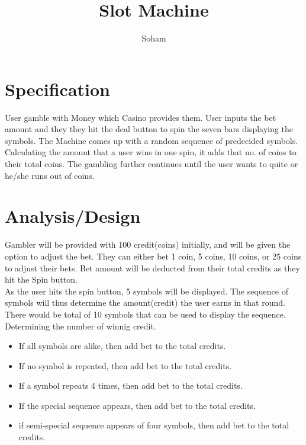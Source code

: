 \documentclass{article}
\title{Slot Machine}
\author{Soham}
\begin{document}
\maketitle

\section{Specification}
User gamble with Money which Casino provides them. User inputs the bet amount and they they hit the deal button to spin the seven bars displaying the symbols.
The Machine comes up with a random sequence of predecided symbols.
Calculating the amount that a user wins in one spin, it adds that no. of coins to their total coins.
The gambling further continues until the user wants to quite or he/she runs out of coins.




\section{Analysis/Design}
Gambler will be provided with 100 credit(coins) initially, and will be given the option to adjust the bet. They can either bet 1 coin, 5 coins, 10 coins, or 25 coins to adjust their bets. Bet amount will be deducted from their total credits as they hit the Spin button.\\

As the user hits the spin button, 5 symbols will be displayed. The sequence of symbols will thus determine the amount(credit) the user earns in that round. \\

There would be total of 10 symbols that can be used to display the sequence.\\

Determining the number of winnig credit.

\begin{itemize}
\item If all symbols are alike, then add bet to the total credits.
\item If no symbol is repeated, then add bet to the total credits.
\item If a symbol repeats 4 times, then add bet to the total credits.
\item If the special sequence appears, then add bet to the total credits.
\item if semi-special sequence appears of four symbols, then add bet to the total credits.
\end{itemize}
\end{document}
